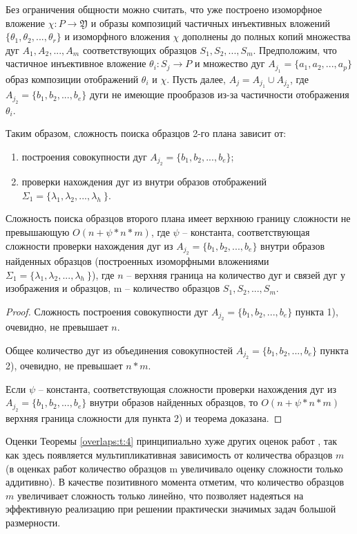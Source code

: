 Без ограничения общности можно считать, что уже построено изоморфное вложение  $\chi : P \to \mathfrak{Y}$  и образы композиций частичных инъективных вложений $\{\theta_1, \theta_2 ,..., \theta_r\}$ и изоморфного вложения $\chi$  дополнены до полных копий множества дуг  $A_1, A_2, ..., A_m$ соответствующих образцов  $S_1, S_2, ..., S_m$.  Предположим,  что частичное инъективное вложение  $\theta_i :  S_j \to P$  и  множество дуг  $A_{j_1} = \{ a_1, a_2 ,... , a_p\}$  образ композиции отображений  $\theta_i$  и $\chi$.  Пусть далее,  $A_j  =  A_{j_1} \cup A_{j_2}$, где  $A_{j_2}  =  \{ b_1, b_2 ,..., b_e\}$ дуги не имеющие прообразов из-за частичности отображения  $\theta_i$. 

Таким образом, сложность  поиска образцов 2-го плана зависит от:
\begin{enumerate}
\item построения  совокупности дуг $A_{j_2}  =  \{ b_1, b_2 ,..., b_e\}$;
\item проверки нахождения дуг из внутри  образов отображений  $\Sigma_1  =  \{\lambda_1, \lambda_2 ,..., \lambda_h\ \}$.
\end{enumerate}

\begin{theorem}
Сложность поиска образцов второго плана имеет верхнюю границу сложности не превышающую  
$O(n+\psi *n*m )$,  где  $\psi$  -- константа, соответствующая сложности проверки нахождения дуг из  $A_{j_2}  =  \{ b_1, b_2 ,..., b_e\}$  внутри  образов найденных образцов (построенных изоморфными вложениями $\Sigma_1  =  \{\lambda_1, \lambda_2 ,..., \lambda_h\ \}$),  где  $n$ -- верхняя граница на количество дуг и связей дуг у изображения и образцов,  m -- количество образцов  $S_1, S_2, ..., S_m$.
\label{overlaps:t:4}
\end{theorem}
\begin{proof}
Сложность построения совокупности дуг $A_{j_2}  =  \{ b_1, b_2 ,..., b_e\}$ пункта  1), очевидно, не превышает  $n$.

Общее количество дуг из объединения совокупностей  $A_{j_2}  =  \{ b_1, b_2 ,..., b_e\}$ пункта  2), очевидно, не превышает   $n*m$. 

Если  $\psi$  -- константа, соответствующая сложности проверки нахождения дуг из $A_{j_2}  =  \{ b_1, b_2 ,..., b_e\}$  внутри  образов найденных образцов,  то  $O(n+\psi *n*m )$ верхняя граница сложности для  пункта  2) и теорема доказана.
\end{proof}

\begin{remark}
Оценки Теоремы \ref{overlaps:t:4} принципиально хуже  других оценок работ
\cite{D8, D19,scaleline}, так как здесь появляется мультипликативная зависимость  от количества образцов  $m$  (в оценках  работ \cite{D8, D19,scaleline} количество образцов  m  увеличивало оценку сложности  только аддитивно). В качестве позитивного момента отметим, что количество образцов  $m$ увеличивает сложность только линейно, что позволяет надеяться на эффективную реализацию при  решении практически значимых задач большой размерности.
\label{overlaps:r:3}
\end{remark}

